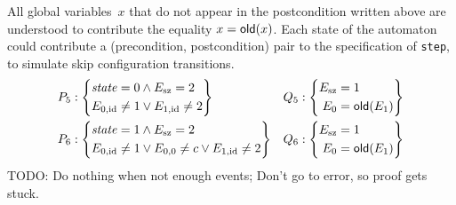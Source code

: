 \documentclass{article} %
\begin{document}
All global variables~$x$ that do not appear in the postcondition written above are understood to contribute the equality $x={\sf old}(x)$.
Each state of the automaton could contribute a (precondition, postcondition) pair to the specification of {\tt step}, to simulate skip configuration transitions.
\begin{align*}
P_5&:\left\{\begin{aligned}
    &{\it state}=0 \land E_{\rm sz}=2 \\
    &E_{0,{\rm id}}\ne1\lor E_{1,{\rm id}}\ne2
    \end{aligned}\right\}
  &Q_5&:\left\{\begin{aligned}
    E_{\rm sz}&=1\\
    E_0&={\sf old}(E_1)
    \end{aligned}\right\} \\
P_6&:\left\{\begin{aligned}
    &{\it state}=1 \land E_{\rm sz}=2 \\
    &E_{0,{\rm id}}\ne1\lor E_{0,0}\ne c \lor E_{1,{\rm id}}\ne2
    \end{aligned}\right\}
  &Q_6&:\left\{\begin{aligned}
    E_{\rm sz}&=1\\
    E_0&={\sf old}(E_1)
    \end{aligned}\right\}
\end{align*}
TODO: Do nothing when not enough events; Don't go to error, so proof gets stuck.
\end{document}
